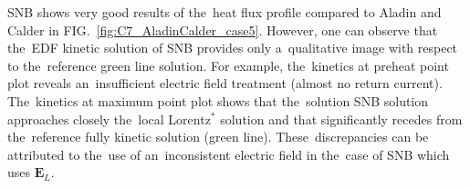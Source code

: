 \documentclass[
 aps,
 jmp,
 amsmath,amssymb,
 twocolumn,
]{revtex4-1}
\newcommand{\figref}[1]{FIG.~\ref{#1}}
\newcommand{\vect}[1]{\boldsymbol{#1}}
\newcommand{\Zbar}{Z}
\newcommand{\E}{\vect{E}}
\begin{document}
SNB shows very good results of the~heat flux profile compared to Aladin 
and Calder in \figref{fig:C7_AladinCalder_case5}. 
However, one can observe that the~EDF kinetic solution of SNB provides 
only a~qualitative image with respect to the~reference green line solution. 
For example, the~kinetics at preheat point plot reveals an~insufficient electric field treatment (almost no return current). 
The~kinetics at maximum point plot shows that the~solution SNB solution
approaches closely the~local Lorentz$^*$ solution and that 
significantly recedes from the~reference fully kinetic solution (green line).
These~discrepancies can be attributed to the~use of an~inconsistent 
electric field in the~case of SNB which uses $\E_L$. 
 %
\end{document}
